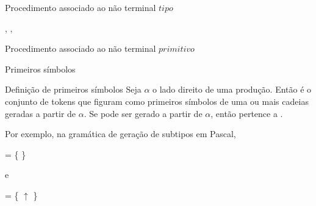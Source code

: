 \begin{frame}[fragile]{Procedimento associado ao não terminal $tipo$}

    \begin{algorithmic}[1]
            , \State{\Call{reconhecer}{\code{pascal}{[}}}
            \State{\Call{reconhecer}{\code{pascal}{]}}}, 
        \Else
        \EndIf
        \EndProcedure
    \end{algorithmic}

\end{frame}

\begin{frame}[fragile]{Procedimento associado ao não terminal $primitivo$}

    \begin{algorithmic}[1]
        \Else
        \EndIf
        \EndProcedure
    \end{algorithmic}

\end{frame}

\begin{frame}[fragile]{Primeiros símbolos}

    \begin{block}{Definição de primeiros símbolos}
        Seja $\alpha$ o lado direito de uma produção. Então  é o conjunto de tokens que figuram como primeiros símbolos de uma ou mais
        cadeias geradas a partir de $\alpha$. Se  pode ser gerado a partir de $\alpha$, então  pertence a .
    \end{block}

    \vspace{0.2in}
    Por exemplo, na gramática de geração de subtipos em Pascal,

    \begin{center} = \{  \}\end{center}

    e

    \begin{center} = \{ $\uparrow$ \}\end{center}

\end{frame}

